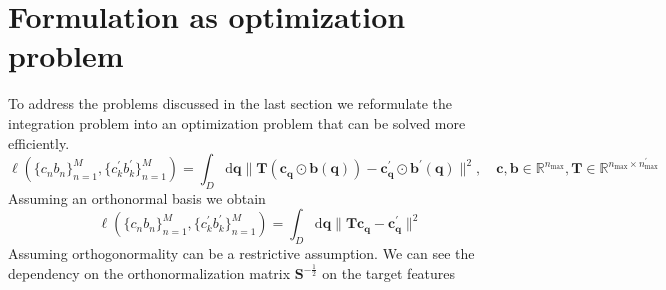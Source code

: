 \section{Formulation as optimization problem}
To address the problems discussed in the last section we reformulate the integration problem into an optimization problem that can be solved more efficiently.
\begin{equation}
  \label{eq:reconstruction_error_basis}
  \ell(\{c_nb_n\}^M_{n=1}, \{c^\prime_kb^\prime_k\}^M_{n=1}) = \int_D\mathrm{d}\mathbf{q}
  \|\mathbf{T}(\mathbf{c}_\mathbf{q}\odot\mathbf{b}(\mathbf{q})) - \mathbf{c}^\prime_\mathbf{q}\odot\mathbf{b}^\prime(\mathbf{q})\|^2,\quad \mathbf{c},\mathbf{b}\in\mathbb{R}^{n_\textrm{max}}, \mathbf{T}\in\mathbb{R}^{n_\textrm{max}\times n^\prime_\textrm{max}}
\end{equation}
Assuming an orthonormal basis we obtain
\begin{equation}
  \label{eq:reconstruction_error_basis_coefficients}
  \ell(\{c_nb_n\}^M_{n=1}, \{c^\prime_kb^\prime_k\}^M_{n=1}) = \int_D\mathrm{d}\mathbf{q}
  \|\mathbf{T}\mathbf{c}_\mathbf{q} - \mathbf{c}^\prime_\mathbf{q}\|^2
\end{equation}
Assuming orthogonormality can be a restrictive assumption.
We can see the dependency on the orthonormalization matrix $\mathbf{S}^{-\frac12}$ on the target features

